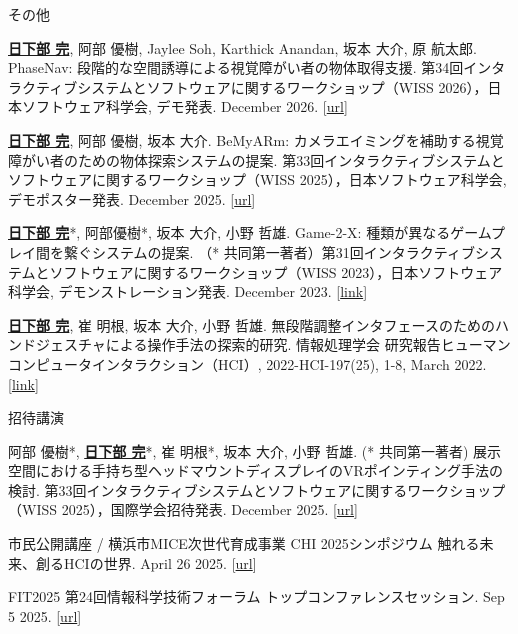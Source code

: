 \documentclass[
	11pt, %
]{resume} %
\begin{document}
\begin{rSection}{その他}{}{}{}
	\item \underline{\textbf{日下部 完}}, 阿部 優樹, Jaylee Soh, Karthick Anandan, 坂本 大介, 原 航太郎. PhaseNav: 段階的な空間誘導による視覚障がい者の物体取得支援. 第34回インタラクティブシステムとソフトウェアに関するワークショップ（WISS 2026），日本ソフトウェア科学会, デモ発表. December 2026. [\href{https://www.wiss.org/WISS2026/demo.html}{url}]
	\item \underline{\textbf{日下部 完}}, 阿部 優樹, 坂本 大介. BeMyARm: カメラエイミングを補助する視覚障がい者のための物体探索システムの提案. 第33回インタラクティブシステムとソフトウェアに関するワークショップ（WISS 2025），日本ソフトウェア科学会, デモポスター発表. December 2025. [\href{https://www.wiss.org/WISS2025/demo.html}{url}]
	\item \underline{\textbf{日下部 完}}*, 阿部優樹*, 坂本 大介, 小野 哲雄. Game-2-X: 種類が異なるゲームプレイ間を繋ぐシステムの提案. （* 共同第一著者）第31回インタラクティブシステムとソフトウェアに関するワークショップ（WISS 2023），日本ソフトウェア科学会, デモンストレーション発表. December 2023. [\href{https://www.wiss.org/WISS2023Proceedings/data/1-A03.pdf}{link}]
	\item \underline{\textbf{日下部 完}}, 崔 明根, 坂本 大介, 小野 哲雄. 無段階調整インタフェースのためのハンドジェスチャによる操作手法の探索的研究. 情報処理学会 研究報告ヒューマンコンピュータインタラクション（HCI）, 2022-HCI-197(25), 1-8, March 2022. [\href{http://id.nii.ac.jp/1001/00217337/}{link}]
\end{rSection}

\begin{rSection}{招待講演}{}{}{}
	\item 阿部 優樹*, \underline{\textbf{日下部 完}}*, 崔 明根*, 坂本 大介, 小野 哲雄. (* 共同第一著者) 展示空間における手持ち型ヘッドマウントディスプレイのVRポインティング手法の検討. 第33回インタラクティブシステムとソフトウェアに関するワークショップ（WISS 2025），国際学会招待発表. December 2025. [\href{https://www.wiss.org/WISS2025/demo.html}{url}]
	\item 市民公開講座 / 横浜市MICE次世代育成事業 CHI 2025シンポジウム 触れる未来、創るHCIの世界. April 26 2025. [\href{https://sigchi.jp/symposium/chi2025_symposium/}{url}]
	\item FIT2025 第24回情報科学技術フォーラム トップコンファレンスセッション. Sep 5 2025. [\href{https://www.gakkai-web.net/fit/program_web/data/html/event/TCS6-1.html}{url}]
\end{rSection}
\end{document}
